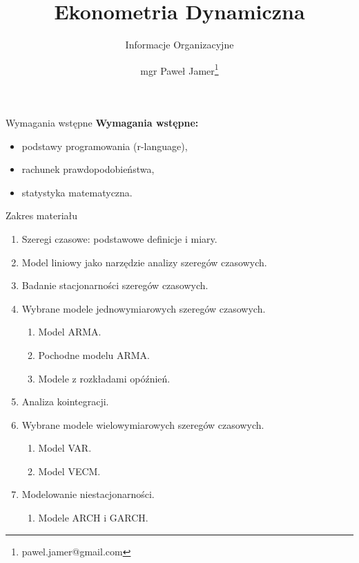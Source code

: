 \documentclass[a4paper, 11pt]{beamer}
\title{Ekonometria Dynamiczna}
\subtitle{Informacje Organizacyjne}
\author{mgr Paweł Jamer\thanks{pawel.jamer@gmail.com}}
\begin{document}
	\begin{frame}
		\titlepage
	\end{frame}

	\begin{frame}{Wymagania wstępne}
		\textbf{Wymagania wstępne:}
		\begin{itemize}
			\item podstawy programowania (r-language),
			\item rachunek prawdopodobieństwa,
			\item statystyka matematyczna.
		\end{itemize}
	\end{frame}
	
	\begin{frame}{Zakres materiału}
		\begin{enumerate}
			\item Szeregi czasowe: podstawowe definicje i miary.
			\item Model liniowy jako narzędzie analizy szeregów czasowych.
			\item Badanie stacjonarności szeregów czasowych.
			\item Wybrane modele jednowymiarowych szeregów czasowych.
			\begin{enumerate}
				\item Model ARMA.
				\item Pochodne modelu ARMA.
				\item Modele z rozkładami opóźnień.
			\end{enumerate}
			\item Analiza kointegracji.
			\item Wybrane modele wielowymiarowych szeregów czasowych.
			\begin{enumerate}
				\item Model VAR.
				\item Model VECM.
			\end{enumerate}
			\item Modelowanie niestacjonarności.
			\begin{enumerate}
				\item Modele ARCH i GARCH.
			\end{enumerate}
		\end{enumerate}
	\end{frame}
	
\end{document}
